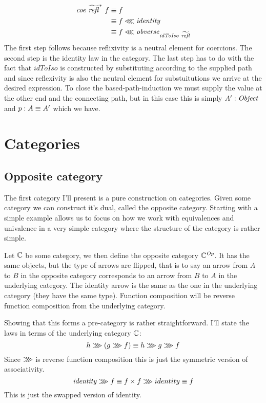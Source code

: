 \begin{align*}
\mathit{coe}\ {\widetilde{\refl}}^*\ f
& \equiv f \\
& \equiv f \lll \mathit{identity} \\
& \equiv f \lll \mathit{obverse}_{\mathit{idToIso}\ \widetilde{\refl}}
\end{align*}
%
The first step follows because reflixivity is a neutral element for coercions.
The second step is the identity law in the category. The last step has to do
with the fact that $\mathit{idToIso}$ is constructed by substituting according
to the supplied path and since reflexivity is also the neutral element for
substuitutions we arrive at the desired expression. To close the
based-path-induction we must supply the value at the other end and the
connecting path, but in this case this is simply $A' \mathrel{:} \mathit{Object}$ and $p \mathrel{:} A
\equiv A'$ which we have.
%
\section{Categories}
\subsection{Opposite category}
\label{op-cat}
The first category I'll present is a pure construction on categories. Given some
category we can construct it's dual, called the opposite category. Starting with
a simple example allows us to focus on how we work with equivalences and
univalence in a very simple category where the structure of the category is
rather simple.

Let $\mathbb{C}$ be some category, we then define the opposite category
$\mathbb{C}^{\mathit{Op}}$. It has the same objects, but the type of arrows are flipped,
that is to say an arrow from $A$ to $B$ in the opposite category corresponds to
an arrow from $B$ to $A$ in the underlying category. The identity arrow is the
same as the one in the underlying category (they have the same type). Function
composition will be reverse function composition from the underlying category.

Showing that this forms a pre-category is rather straightforward. I'll state the
laws in terms of the underlying category $\mathbb{C}$:
%
$$
h \ggg (g \ggg f) \equiv h \ggg g \ggg f
$$
%
Since $\ggg$ is reverse function composition this is just the symmetric version
of associativity.
%
$$
\mathit{identity} \ggg f \equiv f \times f \ggg identity \equiv f
$$
%
This is just the swapped version of identity.

